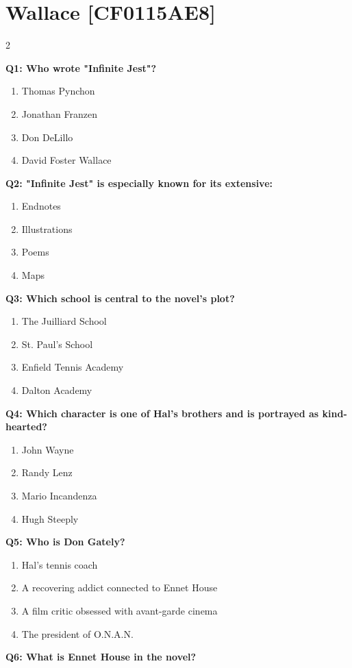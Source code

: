 \documentclass[10pt]{article}
\begin{document}
\section*{Wallace \footnotesize [CF0115AE8]}
\begin{multicols}{2}

\textbf{Q1: Who wrote "Infinite Jest"?}

\begin{enumerate}[label=\arabic*.]
\item Thomas Pynchon
\item Jonathan Franzen
\item Don DeLillo
\item David Foster Wallace
\end{enumerate}
\textbf{Q2: "Infinite Jest" is especially known for its extensive:}

\begin{enumerate}[label=\arabic*.]
\item Endnotes
\item Illustrations
\item Poems
\item Maps
\end{enumerate}
\textbf{Q3: Which school is central to the novel's plot?}

\begin{enumerate}[label=\arabic*.]
\item The Juilliard School
\item St. Paul's School
\item Enfield Tennis Academy
\item Dalton Academy
\end{enumerate}
\textbf{Q4: Which character is one of Hal's brothers and is portrayed as kind-hearted?}

\begin{enumerate}[label=\arabic*.]
\item John Wayne
\item Randy Lenz
\item Mario Incandenza
\item Hugh Steeply
\end{enumerate}
\textbf{Q5: Who is Don Gately?}

\begin{enumerate}[label=\arabic*.]
\item Hal's tennis coach
\item A recovering addict connected to Ennet House
\item A film critic obsessed with avant-garde cinema
\item The president of O.N.A.N.
\end{enumerate}
\textbf{Q6: What is Ennet House in the novel?}


\end{multicols}
\end{document}
